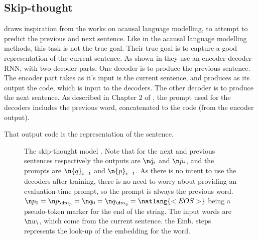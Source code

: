 {\subsection{Skip-thought}
 draws inspiration from the works on acausal language modelling, to attempt to predict the previous and next sentence.
Like in the acausal language modelling methods, this task is not the true goal.
Their true goal is to capture a good representation of the current sentence.
As shown in  they use an encoder-decoder RNN, with two decoder parts.
One decoder is to produce the previous sentence.
The encoder part takes as it's input is the current sentence, and produces as its  output the code,
which is input to the decoders.
The other decoder is to produce the next sentence.
As described in Chapter 2 of , the prompt used for the decoders includes the previous word, concatenated to the code (from the encoder output).

That output code is the representation of the sentence.

\begin{figure}
	\caption{The skip-thought model \parencite{DBLP:journals/corr/KirosZSZTUF15}.
		Note that for the next and previous sentences respectively the outputs are $\n \hat{q}_i$ and $\n \hat{p}_i$,
		and the prompts are $\n {q}_{i-1}$ and $\n {p}_{i-1}$.
		As there is no intent to use the decoders after training, there is no need to worry about providing an evaluation-time prompt, so the prompt is always the previous word.
		$\n p_0= \n p_{\d m_p} = \n q_0= \n q_{\d m_q} =  \natlang{<EOS>}$ being a pseudo-token marker for the end of the string.
		The input words are $\n w_i$, which come from the current sentence.
		the Emb. steps represents the look-up of the embedding for the word.
	}
	\label{fig:skip-thought}
	
\end{figure}}

